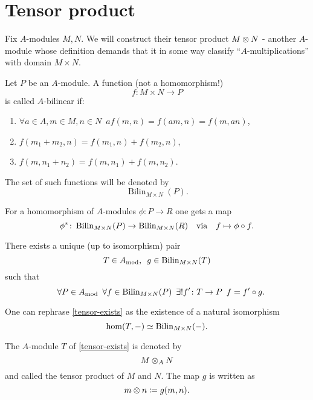 \section{Tensor product}
Fix $A$-modules $M, N$. We will construct their tensor product $M \otimes N$ - another $A$-module whose definition demands that it in some way classify ``$A$-multiplications'' with domain $M \times N$.

\begin{df}
  \label{def-bilinear}
  Let $P$ be an $A$-module. A function (not a homomorphism!)
  \[ f \colon M \times N \to P\]
  is called $A$-bilinear if:
  \begin{enumerate}
  \item $\forall a \in A, m \in M, n \in N \enspace a f(m, n) = f(am, n) = f(m, an)$,
  \item $f(m_1 + m_2, n) = f(m_1, n) + f(m_2, n)$,
  \item $f(m, n_1 + n_2) = f(m, n_1) + f(m, n_2)$.
  \end{enumerate}
  The set of such functions will be denoted by
  \[ \operatorname{Bilin}_{M \times N} (P).\]
\end{df}

\begin{prop}
  \label{tensor-pullback}
  For a homomorphism of $A$-modules $\phi \colon P \to R$ one gets a map
  \[ \phi^* \colon \operatorname{Bilin}_{M \times N}(P) \to \operatorname{Bilin}_{M \times N}(R) \quad \text{via} \quad f \mapsto \phi \circ f.\]
\end{prop}

\begin{theorem}
  \label{tensor-exists}
  There exists a unique (up to isomorphism) pair
  \[ T \in {A}_\mathrm{mod}, \enspace g \in \operatorname{Bilin}_{M \times N}(T)\]
  such that
  \[ \quad \forall P \in {A}_\mathrm{mod} \enspace \forall f \in \operatorname{Bilin}_{M \times N}(P) \enspace \exists \text{!} f' \colon T \to P \enspace f = f' \circ g.\]
\end{theorem}

\begin{note}
  One can rephrase \cref{tensor-exists} as the existence of a natural isomorphism
  \[ \hom(T, -) \simeq \operatorname{Bilin}_{M \times N}(-).\]
\end{note}

\begin{df}
  The $A$-module $T$ of \cref{tensor-exists} is denoted by
  \[ M \otimes_A N \]
  and called the tensor product of $M$ and $N$.
  The map $g$ is written as
  \[ m \otimes n \coloneqq g(m, n).\]
\end{df}

